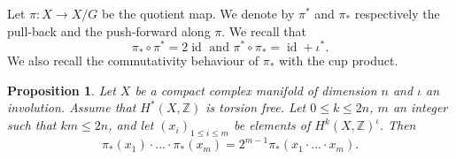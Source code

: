 \documentclass{alggeom}
\DeclareMathOperator{\id}{id}
\newcommand{\tors}{{\rm{tors}}}
\newcommand{\Z}{\mathbb{Z}}
\theoremstyle{plain}
\newtheorem{prop}[theorem]{Proposition}
\theoremstyle{definition}
\theoremstyle{remark}
\begin{document}
Let $\pi: X\rightarrow X/G$ be the quotient map. 
We denote by $\pi^{*}$ and $\pi_{*}$ respectively the pull-back and the push-forward along $\pi$. We recall that 
\begin{equation}
\pi_*\circ \pi^*=2\id \text{ and } \pi^*\circ\pi_* =\id+\iota^*.
\label{pietpi}
\end{equation}
We also recall the commutativity behaviour of $\pi_*$ with the cup product.
\begin{prop}\cite[Lemma 3.3.7]{Lol}\label{commut}
Let $X$ be a compact complex manifold of dimension $n$ and $\iota$ an involution. Assume that $H^{*}(X,\Z)$ is torsion free.
Let $0\leq k \leq 2n$, $m$ an integer such that $km\leq 2n$, and let $(x_{i})_{1\leq i \leq m}$ be elements of $H^{k}(X,\Z)^{\iota}$.
Then $$\pi_{*}(x_{1})\cdot...\cdot \pi_{*}(x_{m})=2^{m-1}\pi_{*}(x_{1}\cdot...\cdot x_{m}).$$
\end{prop}
\end{document}
